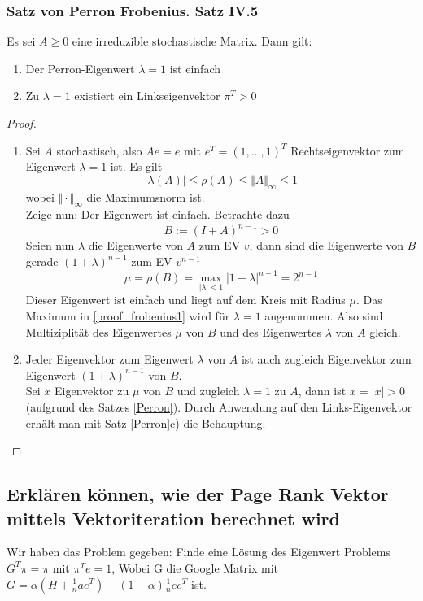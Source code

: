 \documentclass[]{article}
\begin{document}
\subsubsection*{Satz von Perron Frobenius. Satz IV.5}	
Es sei $A \geq 0$ eine irreduzible stochastische Matrix. Dann gilt:
\begin{enumerate}
	\item Der Perron-Eigenwert $\lambda = 1$ ist einfach
	\item Zu $\lambda=1$ existiert ein Linkseigenvektor $\pi^T > 0$
\end{enumerate}


\begin{proof}
	\begin{enumerate}
		\item
		Sei $A$ stochastisch, also $Ae = e$ mit $e^T = (1, \dotsc, 1)^T$ Rechtseigenvektor zum Eigenwert $\lambda = 1$ ist. Es gilt
		\begin{equation*}
		|\lambda(A)| \leq \rho(A) \leq \Vert A \Vert_\infty \leq 1
		\end{equation*}
		wobei $\Vert \cdot \Vert_\infty$ die Maximumsnorm ist. \\
		Zeige nun: Der Eigenwert ist einfach. Betrachte dazu
		\[ B := (I + A)^{n-1} > 0\]
		Seien nun $\lambda$ die Eigenwerte von $A$ zum EV $v$, dann sind die Eigenwerte von $B$ gerade {\nolinebreak $(1+\lambda)^{n-1}$} zum EV $v^{n-1}$\\
		\begin{equation} \label{proof_frobenius1}
		\mu = \rho(B) = \max_{|\lambda| < 1} |1+ \lambda|^{n-1} = 2^{n-1}
		\end{equation}
		Dieser Eigenwert ist einfach und liegt auf dem Kreis mit Radius $\mu$. Das Maximum in \eqref{proof_frobenius1} wird für $\lambda = 1$ angenommen. Also sind Multiziplität des Eigenwertes $\mu$ von $B$ und des Eigenwertes $\lambda$ von $A$ gleich.	
\item Jeder Eigenvektor zum Eigenwert $\lambda$ von $A$ ist auch zugleich Eigenvektor zum Eigenwert $(1 + \lambda)^{n-1}$ von $B$.\\
Sei $x$ Eigenvektor zu $\mu$ von $B$ und zugleich $\lambda=1$ zu $A$, dann ist $x = |x| > 0$ (aufgrund des Satzes \ref{Perron}). 
Durch Anwendung auf den Links-Eigenvektor erhält man mit Satz \ref{Perron}c) die Behauptung.
\end{enumerate}
\end{proof}


\subsection*{Erklären können, wie der Page Rank Vektor mittels Vektoriteration berechnet wird}
Wir haben das Problem gegeben: Finde eine Lösung des Eigenwert Problems $G^T \pi = \pi$ mit $\pi^T e = 1$, Wobei G die Google Matrix mit $G=\alpha(H+ \frac{1}{n}a e^T) + (1- \alpha) \frac{1}{n} e e^T$ ist. 
\end{document}
